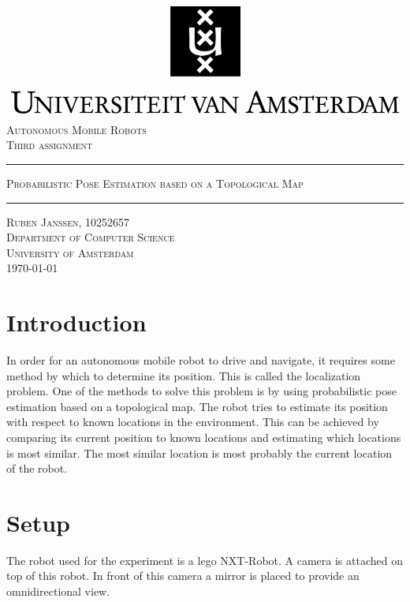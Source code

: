\documentclass[12pt]{article}
\begin{document}
\begin{titlepage}
\begin{center}
    \includegraphics[width=\textwidth]{./logo.png}
    \\ [2.5cm]
    \textsc{\Large Autonomous Mobile Robots}
    \\ [0.5cm]
    \textsc{\large Third assignment}
    \\ [1cm]
    \hrule
    \vspace{0.3cm}
    \textsc{Probabilistic Pose Estimation based on a Topological Map}
    \\ [0.3cm]
    \hrule
    \vfill
    \textsc{Ruben Janssen, 10252657 \\[0.7cm] Department of Computer Science \\ University of Amsterdam \\[0.3cm] \today}
\end{center}
\end{titlepage}
\tableofcontents
\clearpage
\section{Introduction}
In order for an autonomous mobile robot to drive and navigate, it requires some method by which to determine its position. This is called the localization problem. One of the methods to solve this problem is by using probabilistic pose estimation based on a topological map. The robot tries to estimate its position with respect to known locations in the environment. This can be achieved by comparing its current position to known locations and estimating which locations is most similar. The most similar location is most probably the current location of the robot.

\section{Setup}
The robot used for the experiment is a lego NXT-Robot. A camera is attached on top of this robot. In front of this camera a mirror is placed to provide an omnidirectional view. 
\end{document}
